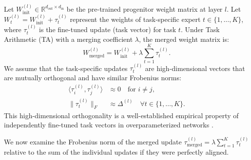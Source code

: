 \documentclass{article}
\theoremstyle{plain}
\theoremstyle{definition}
\theoremstyle{remark}
\begin{document}
Let $W_{\text{init}}^{(l)} \in \mathbb{R}^{d_{\text{out}} \times d_{\text{in}}}$ be the pre-trained progenitor weight matrix at layer $l$. Let $W_t^{(l)} = W_{\text{init}}^{(l)} + \tau_t^{(l)}$ represent the weights of task-specific expert $t \in \{1, \dots, K\}$, where $\tau_t^{(l)}$ is the fine-tuned update (task vector) for task $t$. Under Task Arithmetic (TA) with a merging coefficient $\lambda$, the merged weight matrix is:
\begin{equation}
    W_{\text{merged}}^{(l)} = W_{\text{init}}^{(l)} + \lambda \sum_{t=1}^K \tau_t^{(l)}.
\end{equation}
We assume that the task-specific updates $\tau_t^{(l)}$ are high-dimensional vectors that are mutually orthogonal and have similar Frobenius norms:
\begin{align}
    \langle \tau_i^{(l)}, \tau_j^{(l)} \rangle &\approx 0 \quad \text{for } i \neq j, \label{eq:orthogonality} \\
    \|\tau_t^{(l)}\|_F &\approx \Delta^{(l)} \quad \forall t \in \{1, \dots, K\}. \label{eq:equal_norm}
\end{align}
This high-dimensional orthogonality is a well-established empirical property of independently fine-tuned task vectors in overparameterized networks \cite{jordan23, leclaire24}.

We now examine the Frobenius norm of the merged update $\tau_{\text{merged}}^{(l)} = \lambda \sum_{t=1}^K \tau_t^{(l)}$ relative to the sum of the individual updates if they were perfectly aligned.
\end{document}
